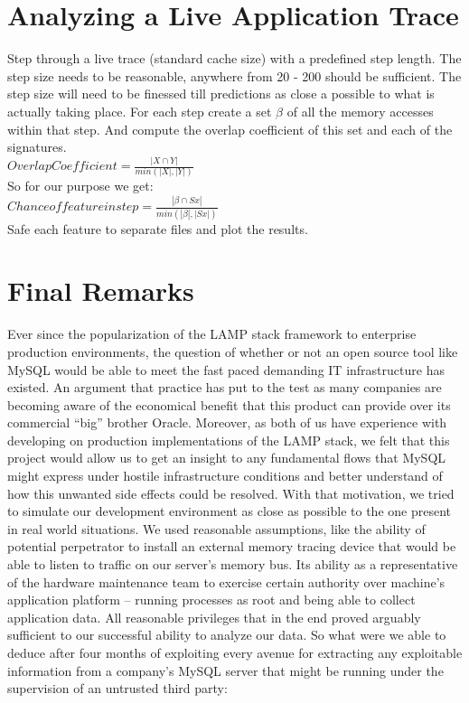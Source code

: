 \documentclass[11pt,a4paper, titlepage, oneside]{article}
\begin{document}
\section{Analyzing a Live Application Trace}
Step through a live trace (standard cache size) with a predefined step length. The step size needs to be reasonable, anywhere from 20 - 200 should be sufficient. The step size will need to be finessed till predictions as close a possible to what is actually taking place. For each step create a set $\beta$ of all the memory accesses within that step. And compute the overlap coefficient of this set and each of the signatures. \\
$Overlap Coefficient = \frac{|X\cap Y|}{min(|X|,|Y|)}$ \\
So for our purpose we get: \\
$Chance of feature in step = \frac{|\beta\cap Sx|}{min(|\beta|, |Sx|)}$ \\
Safe each feature to separate files and plot the results.

\section{Final Remarks}
Ever since the popularization of the LAMP stack framework to enterprise production environments, the question of whether or not an open source tool like MySQL would be able to meet the fast paced demanding IT infrastructure has existed. An argument that practice has put to the test as many companies are becoming aware of the economical benefit that this product can provide over its commercial “big” brother Oracle. Moreover, as both of us have experience with developing on production implementations of the LAMP stack, we felt that this project would allow us to get an insight to any fundamental flows that MySQL might express under hostile infrastructure conditions and better understand of how this unwanted side effects could be resolved. With that motivation, we tried to simulate our development environment as close as possible to the one present in real world situations. We used reasonable assumptions, like the ability of potential perpetrator to install an external memory tracing device that would be able to listen to traffic on our server's memory bus. Its ability as a representative of the hardware maintenance team to exercise certain authority over machine's application platform – running processes as root and being able to collect application data. All reasonable privileges that in the end proved arguably sufficient to our successful ability to analyze our data.
So what were we able to deduce after four months of exploiting every avenue for extracting any exploitable information from a company's MySQL server that might be running under the supervision of an untrusted third party:
\end{document}
